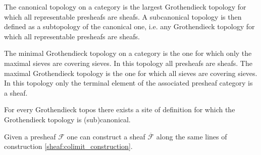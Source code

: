     \begin{example}
        The canonical topology on a category is the largest Grothendieck topology for which all representable presheafs are sheafs. A subcanonical topology is then defined as a subtopology of the canonical one, i.e. any Grothendieck topology for which all representable presheafs are sheafs.
    \end{example}
    \begin{example}
        The minimal Grothendieck topology on a category is the one for which only the maximal sieves are covering sieves. In this topology all presheafs are sheafs. The maximal Grothendieck topology is the one for which all sieves are covering sieves. In this topology only the terminal element of the associated presheaf category is a sheaf.
    \end{example}


    \begin{property}
        For every Grothendieck topos there exists a site of definition for which the Grothendieck topology is (sub)canonical.
    \end{property}

    \begin{construct}[Sheafification]
        Given a presheaf $\mathcal{F}$ one can construct a sheaf $\overline{\mathcal{F}}$ along the same lines of construction \ref{sheaf:colimit_construction}.
    \end{construct}


